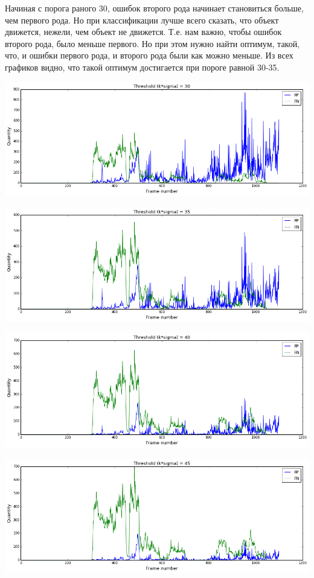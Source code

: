\documentclass[12pt, a4paper]{article}
\begin{document}
			Начиная с порога раного 30, ошибок второго рода начинает становиться больше, чем первого рода. Но при классификации лучше всего сказать, что объект движется, нежели, чем объект не движется. Т.е. нам важно, чтобы ошибок второго рода, было меньше первого. Но при этом нужно найти оптимум, такой, что, и ошибки первого рода, и второго рода были как можно меньше. Из всех графиков видно, что такой оптимум достигается при пороге равной 30-35.
			\begin{center}
				\includegraphics[width=17cm]{1par_k_30.png}
			\end{center}
			\begin{center}
				\includegraphics[width=17cm]{1par_k_35.png}
			\end{center}
			\begin{center}
				\includegraphics[width=17cm]{1par_k_40.png}
			\end{center}
			\begin{center}
				\includegraphics[width=17cm]{1par_k_45.png}
			\end{center}
\end{document}
